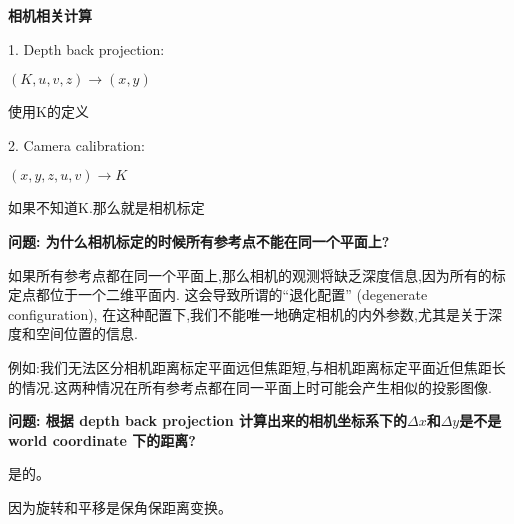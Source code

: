 \textbf{相机相关计算}

1. Depth back projection: 

$(K, u, v, z) \rightarrow (x,y)$

使用K的定义

2. Camera calibration:                 

$(x,y,z,u,v) \rightarrow K$

如果不知道K.那么就是相机标定

\textbf{问题: 为什么相机标定的时候所有参考点不能在同一个平面上?}

如果所有参考点都在同一个平面上,那么相机的观测将缺乏深度信息,因为所有的标定点都位于一个二维平面内.
这会导致所谓的“退化配置” (degenerate configuration),
在这种配置下,我们不能唯一地确定相机的内外参数,尤其是关于深度和空间位置的信息.

例如:我们无法区分相机距离标定平面远但焦距短,与相机距离标定平面近但焦距长的情况.这两种情况在所有参考点都在同一平面上时可能会产生相似的投影图像.

\textbf{问题: 根据 depth back projection 计算出来的相机坐标系下的$\Delta x$和$\Delta y$是不是 world coordinate 下的距离?}

是的。

因为旋转和平移是保角保距离变换。

